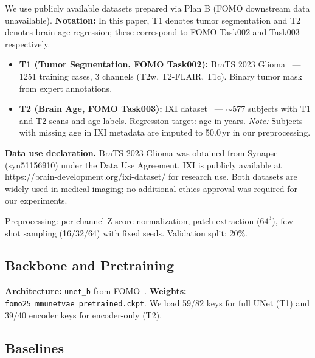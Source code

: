 \documentclass[journal,twoside,web]{ieeecolor}
\begin{document}
We use publicly available datasets prepared via Plan B (FOMO downstream data unavailable). \textbf{Notation:} In this paper, T1 denotes tumor segmentation and T2 denotes brain age regression; these correspond to FOMO Task002 and Task003 respectively.
\begin{itemize}
\item \textbf{T1 (Tumor Segmentation, FOMO Task002):} BraTS 2023 Glioma~\cite{brats2023} --- 1251 training cases, 3 channels (T2w, T2-FLAIR, T1c). Binary tumor mask from expert annotations.
\item \textbf{T2 (Brain Age, FOMO Task003):} IXI dataset~\cite{ixi} --- $\sim$577 subjects with T1 and T2 scans and age labels. Regression target: age in years. \emph{Note:} Subjects with missing age in IXI metadata are imputed to 50.0\,yr in our preprocessing.
\end{itemize}

\textbf{Data use declaration.} BraTS 2023 Glioma was obtained from Synapse (syn51156910) under the Data Use Agreement. IXI is publicly available at \url{https://brain-development.org/ixi-dataset/} for research use. Both datasets are widely used in medical imaging; no additional ethics approval was required for our experiments.

Preprocessing: per-channel Z-score normalization, patch extraction ($64^3$), few-shot sampling (16/32/64) with fixed seeds. Validation split: 20\%.

\subsection{Backbone and Pretraining}
\label{sec:backbone}

\textbf{Architecture:} \texttt{unet\_b} from FOMO~\cite{fomo2025}. \textbf{Weights:} \texttt{fomo25\_mmunetvae\_pretrained.ckpt}. We load 59/82 keys for full UNet (T1) and 39/40 encoder keys for encoder-only (T2).

\subsection{Baselines}
\label{sec:baselines}
\end{document}
